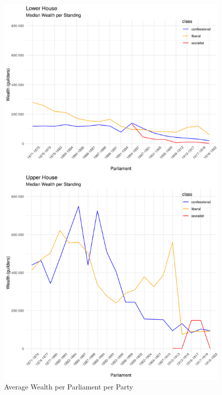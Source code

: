 \begin{figure}
    \centering
    \includegraphics[scale=0.60]{figures/step8fig2wealthperparlperparty.png}
    \caption{Average Wealth per Parliament per Party}
    \label{fig:avgwealthtimeparty}
\end{figure}
\clearpage



\clearpage



\clearpage


